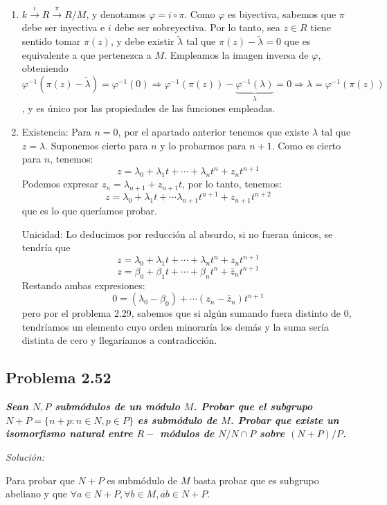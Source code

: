 \begin{enumerate}
\item $k\xrightarrow{i} R \xrightarrow{\pi} R/M$, y denotamos $\varphi=i \circ \pi$. Como $\varphi$ es biyectiva, sabemos que $\pi$ debe ser inyectiva e $i$ debe ser sobreyectiva. Por lo tanto, sea $z\in R$ tiene sentido tomar $\pi(z)$, y debe existir $\tilde{\lambda}$ tal que $\pi(z)-\tilde{\lambda}=0$ que es equivalente a que pertenezca a $M$. Empleamos la imagen inversa de $\varphi$, obteniendo $\varphi^{-1}(\pi(z)-\tilde{\lambda})=\varphi^{-1}(0) \Rightarrow \varphi^{-1}(\pi(z))-\underbrace{\varphi^{-1}(\lambda)}_{\lambda}=0 \Rightarrow \lambda = \varphi^{-1}(\pi(z))$, y es único por las propiedades de las funciones empleadas.

\item Existencia: Para $n=0$, por el apartado anterior tenemos que existe $\lambda$ tal que $z=\lambda$.  Suponemos cierto para $n$ y lo probarmos para $n+1$. Como es cierto para $n$, tenemos:
  $$ z= \lambda_0+\lambda_1t+\cdots +\lambda_n t^n+z_nt^{n+1}$$
  Podemos expresar $z_n= \lambda_{n+1} + z_{n+1}t$, por lo tanto, tenemos:
  $$ z = \lambda_0 +\lambda_1t + \cdots \lambda_{n+1}t^{n+1}+z_{n+1}t^{n+2}$$
  que es lo que queríamos probar.

  Unicidad: Lo deducimos por reducción al absurdo, si no fueran únicos, se tendría que
  $$ z = \lambda_0+\lambda_1t+\cdots +\lambda_n t^n+z_nt^{n+1}$$
  $$ z = \beta_0 + \beta_1 t+ \cdots +\beta_n t^n + \bar{z}_n t^{n+1}$$
  Restando ambas expresiones:
  $$ 0 = (\lambda_0-\beta_0) + \cdots (z_n-\bar{z}_n)t^{n+1}$$
  pero por el problema 2.29, sabemos que si algún sumando fuera distinto de 0, tendríamos un elemento cuyo orden minoraría los demás y la suma sería distinta de cero y llegaríamos a contradicción.
\end{enumerate}

\subsection{Problema 2.52}

\textit{\textbf{Sean $N,P$ submódulos de un módulo $M$. Probar que el subgrupo $N+P=\{n+p : n\in N, p \in P \}$ es submódulo de $M$. Probar que existe un isomorfismo natural entre $R-$ módulos de $N/N\cap P$ sobre $(N+P)/P$.}}

\textit{Solución:}

Para probar que $N+P$ es submódulo de $M$ basta probar que es subgrupo abeliano y que $\forall a \in N+P, \forall b \in M, ab \in N+P$.

